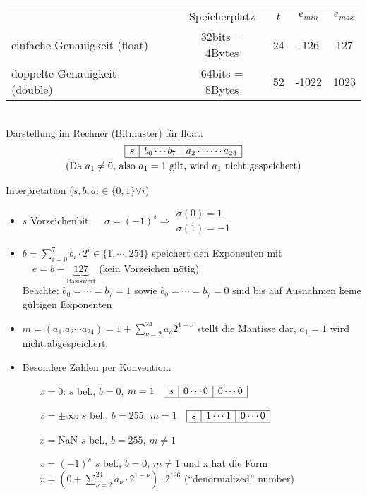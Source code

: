 \begin{tabular}{l@{}cccc@{}}
  & Speicherplatz & $t$ & $e_{min}$ & $e_{max}$ \\
  \cmidrule{2-5}
  einfache Genauigkeit (float) \index{floating point} & 32bits = 4Bytes & 24 &-126 & 127 \\
  doppelte  Genauigkeit (double)~~\index{double} & 64bits = 8Bytes& 52 & -1022 & 1023
\end{tabular}\\

Darstellung im Rechner (Bitmuster) für float:
\begin{gather*}
  \floatbox{s}{b_0\cdots b_7}{a_2\cdots\cdots a_{24}}\\
  \text{(Da $a_1\neq 0$, also $a_1=1$ gilt, wird $a_1$ nicht gespeichert)}
\end{gather*}

Interpretation ($s,b,a_i\in\{0,1\} \forall i$)
\begin{itemize}
\item $s$ Vorzeichenbit: 
  $\quad \sigma=(-1)^s\Rightarrow 
  \begin{array}{l}
    \sigma(0)=1 \\
    \sigma(1)=-1
  \end{array} $
\item $b=\sum_{i=0}^{7}b_i\cdot2^i \in \{1, \cdots, 254\}$ speichert den Exponenten mit \\
  $ \quad e = b-\underbrace{127}_\text{Basiswert}$ (kein Vorzeichen nötig) \\
  Beachte: $b_0=\cdots=b_7=1$ sowie $b_0=\cdots=b_7=0$ sind bis auf Ausnahmen keine gültigen Exponenten
\item $m=(a_1.a_2\cdots a_{24})=1+\sum_{\nu=2}^{24}a_{\nu}2^{1-\nu}$ stellt die Mantisse dar, $a_1=1$ wird nicht abgespeichert.
\item Besondere Zahlen per Konvention:
  \begin{itemize}
  \item[$x=0$:] $s$ bel., $b=0$, $m=1 \quad \floatbox{s}{0\cdots0}{0\cdots0}$
  \item[$x=\pm\infty$:]  $s$ bel., $b=255$, $m=1  \quad \floatbox{s}{1\cdots1}{0\cdots0}$
  \item[$x=$NaN] $s$ bel., $b=255$, $m\neq 1$
  \item[$x=(-1)^s$] $s$ bel., $b=0$, $m\neq 1$ und x hat die Form $x=(0+\sum_{\nu=2}^{24}a_{\nu}\cdot 2^{1-\nu})\cdot 2^{126}$ (\enquote{denormalized} number)
  \end{itemize}
\end{itemize}

